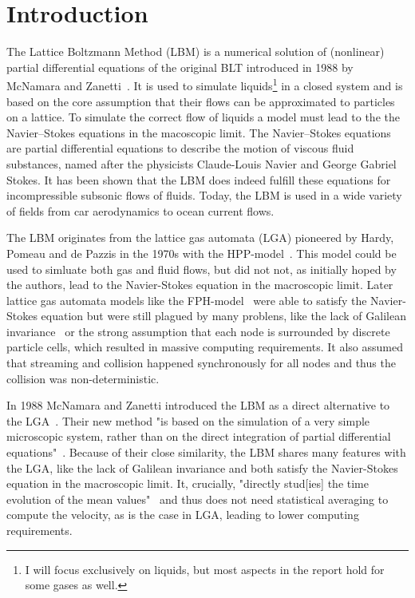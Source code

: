 
\chapter{Introduction}
The Lattice Boltzmann Method (LBM) is a numerical solution of (nonlinear) partial differential equations of the original BLT introduced in 1988 by McNamara and Zanetti~\cite{mcnamara1988boltzmann-method}.
It is used to simulate liquids\footnote{I will focus exclusively on liquids, but most aspects in the report hold for some gases as well.} in a closed system and is based on the core assumption that their flows can be approximated to particles on a lattice.
To simulate the correct flow of liquids a model must lead to the the Navier–Stokes equations in the macoscopic limit.
The Navier–Stokes equations are partial differential equations to describe the motion of viscous fluid substances, named after the physicists Claude-Louis Navier and George Gabriel Stokes.
It has been shown that the LBM does indeed fulfill these equations for incompressible subsonic flows of fluids.
Today, the LBM is used in a wide variety of fields from car aerodynamics to ocean current flows.

The LBM originates from the lattice gas automata (LGA) pioneered by Hardy, Pomeau and de Pazzis in the 1970s with the HPP-model~\cite{hardy1973timeHPP}.
This model could be used to simluate both gas and fluid flows, but did not not, as initially hoped by the authors, lead to the Navier-Stokes equation in the macroscopic limit.
Later lattice gas automata models like the FPH-model~\cite{PhysRevLett.56.1505-fhp} were able to satisfy the Navier-Stokes equation but were still plagued by many problens, like the lack of Galilean invariance~\cite{nie2008galileanInvariance} or the strong assumption
that each node is surrounded by discrete particle cells, which resulted in massive computing requirements.
It also assumed that streaming and collision happened synchronously for all nodes and thus the collision was non-deterministic.

In 1988 McNamara and Zanetti introduced the LBM as a direct alternative to the LGA~\cite{mcnamara1988boltzmann-method}.
Their new method "is based on the simulation of a very simple microscopic system, rather than on the direct integration of partial differential equations"~\cite{mcnamara1988boltzmann-method}.
Because of their close similarity, the LBM shares many features with the LGA, like the lack of Galilean invariance and both satisfy the Navier-Stokes equation in the macroscopic limit.
It, crucially, "directly stud[ies] the time evolution of the mean values"~\cite{mcnamara1988boltzmann-method} and thus does not need statistical averaging to compute the velocity, as is the case in LGA, leading to lower computing requirements.

